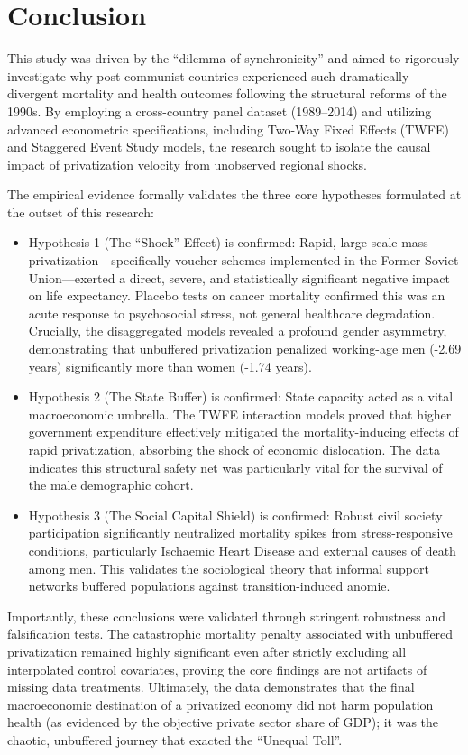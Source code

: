 \documentclass[12pt]{article}
\begin{document}
\section{Conclusion}
This study was driven by the ``dilemma of synchronicity'' and aimed to rigorously investigate why post-communist countries experienced such dramatically divergent mortality and health outcomes 
following the structural reforms of the 1990s. By employing a cross-country panel dataset (1989--2014) and utilizing advanced econometric specifications, including Two-Way Fixed Effects (TWFE) and 
Staggered Event Study models, the research sought to isolate the causal impact of privatization velocity from unobserved regional shocks.

The empirical evidence formally validates the three core hypotheses formulated at the outset of this research:
\begin{itemize}
    \item Hypothesis 1 (The ``Shock'' Effect) is confirmed: Rapid, large-scale mass privatization---specifically voucher schemes implemented in the Former Soviet Union---exerted a direct, 
    severe, and statistically significant negative impact on life expectancy. Placebo tests on cancer mortality confirmed this was an acute response to psychosocial stress, not general healthcare 
    degradation. Crucially, the disaggregated models revealed a profound gender asymmetry, demonstrating that unbuffered privatization penalized working-age men (-2.69 years) significantly more than 
    women (-1.74 years).
    \item Hypothesis 2 (The State Buffer) is confirmed: State capacity acted as a vital macroeconomic umbrella. The TWFE interaction models proved that higher government expenditure effectively 
    mitigated the mortality-inducing effects of rapid privatization, absorbing the shock of economic dislocation. The data indicates this structural safety net was particularly vital for the survival of 
    the male demographic cohort.
    \item Hypothesis 3 (The Social Capital Shield) is confirmed: Robust civil society participation significantly neutralized mortality spikes from stress-responsive conditions, particularly 
    Ischaemic Heart Disease and external causes of death among men. This validates the sociological theory that informal support networks buffered populations against transition-induced anomie.
\end{itemize}

Importantly, these conclusions were validated through stringent robustness and falsification tests. The catastrophic mortality penalty associated with unbuffered privatization remained highly significant 
even after strictly excluding all interpolated control covariates, proving the core findings are not artifacts of missing data treatments. Ultimately, the data demonstrates that the final macroeconomic 
destination of a privatized economy did not harm population health (as evidenced by the objective private sector share of GDP); it was the chaotic, unbuffered journey that exacted the ``Unequal Toll''.
\end{document}
